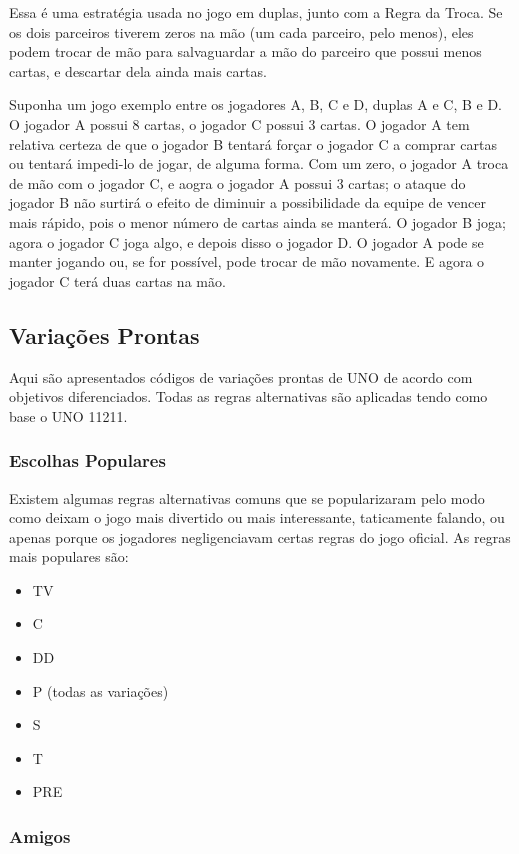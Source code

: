 Essa é uma estratégia usada no jogo em duplas, junto com a Regra da Troca. Se os dois parceiros tiverem zeros na mão (um cada parceiro, pelo menos), eles podem trocar de mão para salvaguardar a mão do parceiro que possui menos cartas, e descartar dela ainda mais cartas.

Suponha um jogo exemplo entre os jogadores A, B, C e D, duplas A e C, B e D. O jogador A possui 8 cartas, o jogador C possui 3 cartas. O jogador A tem relativa certeza de que o jogador B tentará forçar o jogador C a comprar cartas ou tentará impedi-lo de jogar, de alguma forma. Com um zero, o jogador A troca de mão com o jogador C, e aogra o jogador A possui 3 cartas; o ataque do jogador B não surtirá o efeito de diminuir a possibilidade da equipe de vencer mais rápido, pois o menor número de cartas ainda se manterá. O jogador B joga; agora o jogador C joga algo, e depois disso o jogador D.  O jogador A pode se manter jogando ou, se for possível, pode trocar de mão novamente. E agora o jogador C terá duas cartas na mão.

\subsection{Variações Prontas}

Aqui são apresentados códigos de variações prontas de UNO de acordo com objetivos diferenciados. Todas as regras alternativas são aplicadas tendo como base o UNO 11211.

\subsubsection{Escolhas Populares}

Existem algumas regras alternativas comuns que se popularizaram pelo modo como deixam o jogo mais divertido ou mais interessante, taticamente falando, ou apenas porque os jogadores negligenciavam certas regras do jogo oficial. As regras mais populares são:

\begin{itemize}
\item{TV}
\item{C}
\item{DD}
\item{P (todas as variações)}
\item{S}
\item{T}
\item{PRE}
\end{itemize}

\subsubsection{Amigos}

